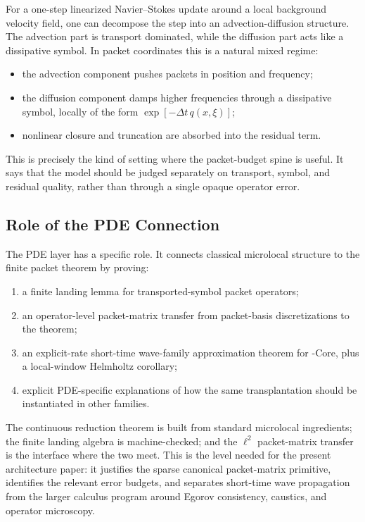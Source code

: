 For a one-step linearized Navier--Stokes update around a local background velocity field, one can decompose the step into an advection-diffusion structure. The advection part is transport dominated, while the diffusion part acts like a dissipative symbol. In packet coordinates this is a natural mixed regime:
\begin{itemize}
\item the advection component pushes packets in position and frequency;
\item the diffusion component damps higher frequencies through a dissipative symbol, locally of the form $\exp[-\Delta t\,q(x,\xi)]$;
\item nonlinear closure and truncation are absorbed into the residual term.
\end{itemize}
This is precisely the kind of setting where the packet-budget spine is useful. It says that the model should be judged separately on transport, symbol, and residual quality, rather than through a single opaque operator error.

\subsection{Role of the PDE Connection}

The PDE layer has a specific role.  It connects classical microlocal structure to the finite packet theorem by proving:
\begin{enumerate}
\item a finite landing lemma for transported-symbol packet operators;
\item an operator-level packet-matrix transfer from packet-basis discretizations to the theorem;
\item an explicit-rate short-time wave-family approximation theorem for \MiNO-Core, plus a local-window Helmholtz corollary;
\item explicit PDE-specific explanations of how the same transplantation should be instantiated in other families.
\end{enumerate}
The continuous reduction theorem is built from standard microlocal ingredients; the finite landing algebra is machine-checked; and the $\ell^2$ packet-matrix transfer is the interface where the two meet.  This is the level needed for the present architecture paper: it justifies the sparse canonical packet-matrix primitive, identifies the relevant error budgets, and separates short-time wave propagation from the larger calculus program around Egorov consistency, caustics, and operator microscopy.
